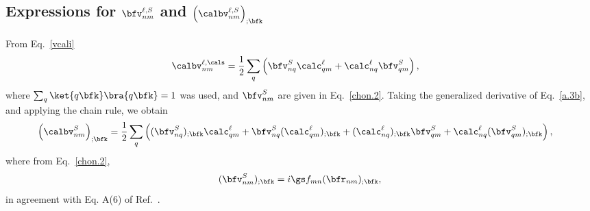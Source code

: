 \subsection{Expressions for  \texorpdfstring{$\bfv^{\ell,S}_{nm}$}{Vnm}
and
\texorpdfstring{$\Big({\calbv}^{\ell,S}_{nm}\Big)_{;\bfk}$}{(Vnm);kb}
}\label{calvs} 
From Eq.~\eqref{vcali}
\begin{align}\label{a.3b}
\calbv^{\ell,\cals}_{nm}
&=
\frac{1}{2}\sum_q\left(   
\bfv^S_{nq}\calc^\ell_{qm}+\calc^\ell_{nq}\bfv^S_{qm}
\right)  
,
\end{align}    
where $\sum_q\ket{q\bfk}\bra{q\bfk}=1$ was used,
and $\bfv^S_{nm}$ are given in Eq.~\eqref{chon.2}.
Taking the generalized derivative of Eq.~\eqref{a.3b}, and applying
the chain rule, we obtain
\begin{align}\label{a.3b}
\left(\calbv^S_{nm}\right)_{;\bfk}
&=
\frac{1}{2}\sum_q\left(
(\bfv^S_{nq})_{;\bfk}\calc^\ell_{qm}
+    
\bfv^S_{nq}(\calc^\ell_{qm})_{;\bfk}
+
(\calc^\ell_{nq})_{;\bfk} \bfv^S_{qm}
+
\calc^\ell_{nq} (\bfv^S_{qm})_{;\bfk}
\right)  
,
\end{align}    
where from 
Eq.~\eqref{chon.2}, 
\begin{align}\label{choni.1}
(\bfv^S_{nm})_{;\bfk}=i\gs f_{mn}
(\bfr_{nm})_{;\bfk}
,
\end{align}
in agreement with Eq. A(6) of Ref.~.


